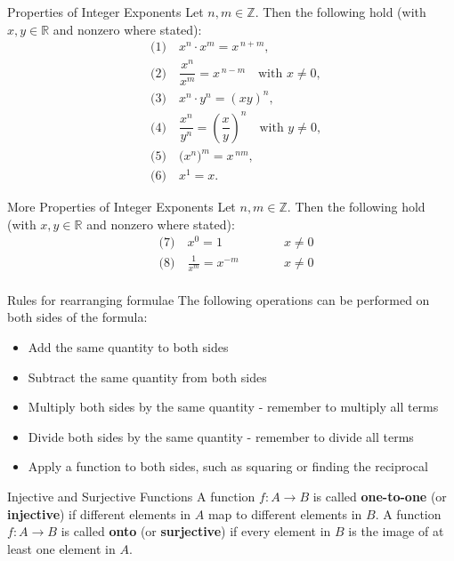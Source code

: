 \begin{proposition}{Properties of Integer Exponents}
\label{prop:DefPow}
Let $n,m\in\mathbb{Z}$. Then the following hold (with $x,y\in\mathbb{R}$ and nonzero where stated):
\[
\begin{aligned}
&\text{(1)}\quad x^{n}\cdot x^{m}=x^{\,n+m},\\[2pt]
&\text{(2)}\quad \dfrac{x^{n}}{x^{m}}=x^{\,n-m}\quad \text{with } x\neq 0,\\[2pt]
&\text{(3)}\quad x^{n}\cdot y^{n}=(xy)^{n},\\[2pt]
&\text{(4)}\quad \dfrac{x^{n}}{y^{n}}=\left(\dfrac{x}{y}\right)^{n}\quad \text{with } y\neq 0,\\[2pt]
&\text{(5)}\quad \bigl(x^{n}\bigr)^{m}=x^{\,nm},\\[2pt]
&\text{(6)}\quad x^{1}=x.
\end{aligned}
\]
\end{proposition}

\begin{proposition}{More Properties of Integer Exponents}
Let $n,m\in\mathbb{Z}$. Then the following hold (with $x,y\in\mathbb{R}$ and nonzero where stated):
\[
\begin{aligned}
&\text{(7)}\quad x^{0}=1   &\qquad&   x \neq 0  \\
&\text{(8)}\quad \frac{1}{x^{m}}=x^{-m} &\qquad& x \neq 0 \\
\end{aligned}
\]
\end{proposition}

\begin{custombox}{Rules for rearranging formulae}
The following operations can be performed on both sides of the formula:
\begin{itemize}
    \item Add the same quantity to both sides
    \item Subtract the same quantity from both sides
    \item Multiply both sides by the same quantity - remember to multiply all terms
    \item Divide both sides by the same quantity - remember to divide all terms
    \item Apply a function to both sides, such as squaring or finding the reciprocal
\end{itemize}
\end{custombox}

\begin{definition} {Injective and Surjective Functions}
A function \( f: A \rightarrow B \) is called \textbf{one-to-one} (or \textbf{injective}) if different elements in \( A \) map to different elements in \( B \). 
A function \( f: A \rightarrow B \) is called \textbf{onto} (or \textbf{surjective}) if every element in \( B \) is the image of at least one element in \( A \).
\end{definition}

